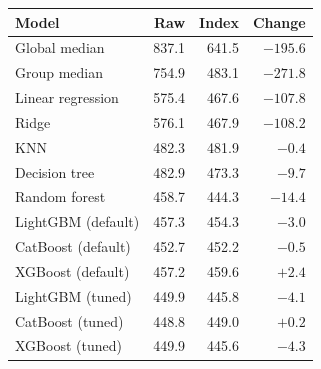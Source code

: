 \begin{tabular}{lrrr}
\hline
\textbf{Model} & \textbf{Raw} & \textbf{Index} & \textbf{Change} \\
\hline
Global median & 837.1 & 641.5 & $-195.6$ \\
Group median & 754.9 & 483.1 & $-271.8$ \\
Linear regression & 575.4 & 467.6 & $-107.8$ \\
Ridge & 576.1 & 467.9 & $-108.2$ \\
KNN & 482.3 & 481.9 & $-0.4$ \\
Decision tree & 482.9 & 473.3 & $-9.7$ \\
Random forest & 458.7 & 444.3 & $-14.4$ \\
LightGBM (default) & 457.3 & 454.3 & $-3.0$ \\
CatBoost (default) & 452.7 & 452.2 & $-0.5$ \\
XGBoost (default) & 457.2 & 459.6 & $+2.4$ \\
LightGBM (tuned) & 449.9 & 445.8 & $-4.1$ \\
CatBoost (tuned) & 448.8 & 449.0 & $+0.2$ \\
XGBoost (tuned) & 449.9 & 445.6 & $-4.3$ \\
\hline
\end{tabular}
